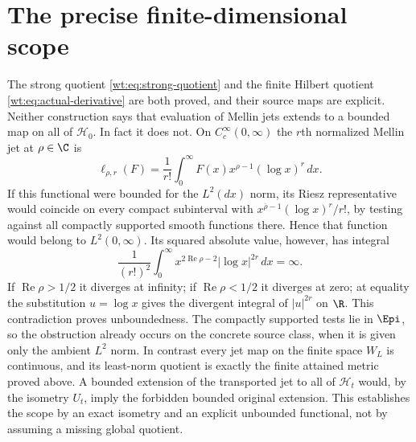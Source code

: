 \section{The precise finite-dimensional scope}
\label{wt:sec:scope}

The strong quotient \eqref{wt:eq:strong-quotient} and the finite
Hilbert quotient \eqref{wt:eq:actual-derivative} are both proved,
and their source maps are explicit.  Neither construction says
that evaluation of Mellin jets extends to a bounded map on all
of $\mathcal H_0$.  In fact it does not.  On $C_c^\infty(0,\infty)$
the $r$th normalized Mellin jet at $\rho\in\C$ is
\[
 \ell_{\rho,r}(F)=\frac1{r!}\int_0^\infty
       F(x)x^{\rho-1}(\log x)^r\,dx.
\]
If this functional were bounded for the $L^2(dx)$ norm, its
Riesz representative would coincide on every compact subinterval
with $x^{\overline\rho-1}(\log x)^r/r!$, by testing against
all compactly supported smooth functions there.  Hence that
function would belong to $L^2(0,\infty)$.  Its squared absolute
value, however, has integral
\[
 \frac1{(r!)^2}\int_0^\infty
   x^{2\operatorname{Re}\rho-2}|\log x|^{2r}\,dx=\infty.
\]
If $\operatorname{Re}\rho>1/2$ it diverges at infinity;
if $\operatorname{Re}\rho<1/2$ it diverges at zero; at equality
the substitution $u=\log x$ gives the divergent integral of
$|u|^{2r}$ on $\R$.  This contradiction proves unboundedness.
The compactly supported tests lie in $\Epi$, so the obstruction
already occurs on the concrete source class, when it is given
only the ambient $L^2$ norm.  In contrast every jet map on the
finite space $W_L$ is continuous, and its least-norm quotient
is exactly the finite attained metric proved above.  A bounded
extension of the transported jet to all of $\mathcal H_t$ would, by the
isometry $U_t$, imply the forbidden bounded original extension.
This establishes the scope by an exact isometry and an explicit
unbounded functional, not by assuming a missing global quotient.

